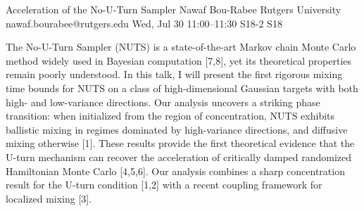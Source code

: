 \documentclass[12pt,lettersize,oneside]{book} %
\begin{document}
\begin{talk}
  {Acceleration of the No-U-Turn Sampler}%
  {Nawaf Bou-Rabee}%
  {Rutgers University}%
  {nawaf.bourabee@rutgers.edu}%
  {}%
  {}%
  {Wed, Jul 30 11:00--11:30}%
  {S18-2}%
  {S18}%
  {}%
  
    
   

\medskip

The No-U-Turn Sampler (NUTS) is a state-of-the-art Markov chain Monte Carlo method widely used in Bayesian computation [7,8], yet its theoretical properties remain poorly understood. In this talk, I will present the first rigorous mixing time bounds for NUTS on a class of high-dimensional Gaussian targets with both high- and low-variance directions. Our analysis uncovers a striking phase transition: when initialized from the region of concentration, NUTS exhibits ballistic mixing in regimes dominated by high-variance directions, and diffusive mixing otherwise [1]. These results provide the first theoretical evidence that the U-turn mechanism can recover the acceleration of critically damped randomized Hamiltonian Monte Carlo [4,5,6].  Our analysis combines a sharp concentration result for the U-turn condition [1,2] with a recent coupling framework for localized mixing [3]. 


\end{talk}
\end{document}
